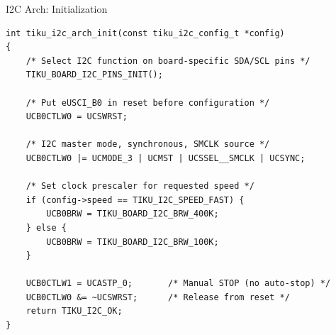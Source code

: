 \documentclass[aspectratio=169, 10pt]{beamer}
\begin{document}
\begin{frame}[fragile]{I2C Arch: Initialization}
\begin{lstlisting}[style=cstyle, title={arch/msp430/tiku\_i2c\_arch.c --- tiku\_i2c\_arch\_init()}]
int tiku_i2c_arch_init(const tiku_i2c_config_t *config)
{
    /* Select I2C function on board-specific SDA/SCL pins */
    TIKU_BOARD_I2C_PINS_INIT();

    /* Put eUSCI_B0 in reset before configuration */
    UCB0CTLW0 = UCSWRST;

    /* I2C master mode, synchronous, SMCLK source */
    UCB0CTLW0 |= UCMODE_3 | UCMST | UCSSEL__SMCLK | UCSYNC;

    /* Set clock prescaler for requested speed */
    if (config->speed == TIKU_I2C_SPEED_FAST) {
        UCB0BRW = TIKU_BOARD_I2C_BRW_400K;
    } else {
        UCB0BRW = TIKU_BOARD_I2C_BRW_100K;
    }

    UCB0CTLW1 = UCASTP_0;       /* Manual STOP (no auto-stop) */
    UCB0CTLW0 &= ~UCSWRST;      /* Release from reset */
    return TIKU_I2C_OK;
}
\end{lstlisting}
\end{frame}
\end{document}
